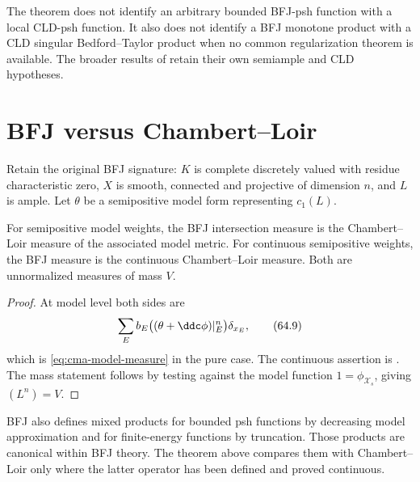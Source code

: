 \begin{remark}
\label{rem:cma-no-global-cld}
The theorem does not identify an arbitrary bounded BFJ-psh function with a
local CLD-psh function.
It also does not identify a BFJ monotone product with a CLD singular
Bedford--Taylor product when no common regularization theorem is available.
The broader results of \cite[Theorems~7.14 and~8.4]{BE21} retain their own
semiample and CLD hypotheses.
\end{remark}

\section{BFJ versus Chambert--Loir}
\label{sec:cma-bfj-cl}

Retain the original BFJ signature:
$K$ is complete discretely valued with residue characteristic zero,
$X$ is smooth, connected and projective of dimension $n$, and $L$ is ample.
Let $\theta$ be a semipositive model form representing $c_1(L)$.

\begin{theorem}\label{thm:cma-bfj-cl}
For semipositive model weights, the BFJ intersection measure is the
Chambert--Loir measure of the associated model metric.
For continuous semipositive weights, the BFJ measure is the continuous
Chambert--Loir measure.
Both are unnormalized measures of mass $V$.
\end{theorem}

\begin{proof}
At model level both sides are
\[
       \sum_E b_E
       \bigl((\theta+\ddc\phi)|_E^n\bigr)\delta_{x_E},
\tag{64.9}\label{eq:cma-bfj-model}
\]
which is \eqref{eq:cma-model-measure} in the pure case.
The continuous assertion is
.
The mass statement follows by testing against the model function
$1=\phi_{\mathcal X_s}$, giving $(L^n)=V$.
\end{proof}

BFJ also defines mixed products for bounded psh functions by decreasing
model approximation and for finite-energy functions by truncation.
Those products are canonical within BFJ theory.
The theorem above compares them with Chambert--Loir only where the latter
operator has been defined and proved continuous.

